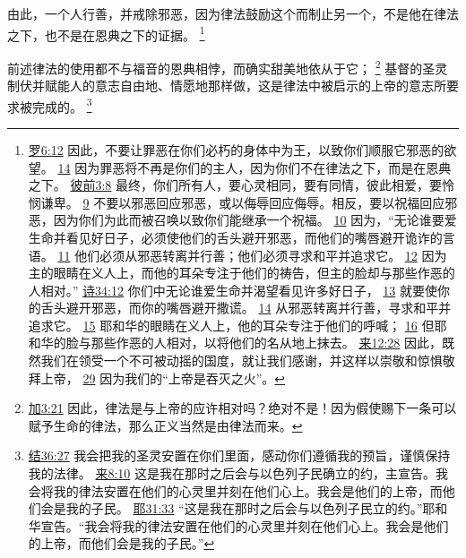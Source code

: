 \documentclass[12pt, a4paper, oneside]{ctexart}
\newcounter{parnum}[section]
\newcommand{\N}{%
   \noindent\refstepcounter{parnum}%
    \makebox[\parindent][l]{\textbf{\arabic{parnum}.}}}
\begin{document}
	由此，一个人行善，并戒除邪恶，因为律法鼓励这个而制止另一个，不是他在律法之下，也不是在恩典之下的证据。
	\footnote {
		\href{https://biblehub.com/romans/6-12.htm}{罗6:12} 因此，不要让罪恶在你们必朽的身体中为王，以致你们顺服它邪恶的欲望。
		\href{https://biblehub.com/romans/6-14.htm}{14} 因为罪恶将不再是你们的主人，因为你们不在律法之下，而是在恩典之下。
		\href{https://biblehub.com/1_peter/3-8.htm}{彼前3:8} 最终，你们所有人，要心灵相同，要有同情，彼此相爱，要怜悯谦卑。
		\href{https://biblehub.com/1_peter/3-9.htm}{9} 不要以邪恶回应邪恶，或以侮辱回应侮辱。相反，要以祝福回应邪恶，因为你们为此而被召唤以致你们能继承一个祝福。
		\href{https://biblehub.com/1_peter/3-10.htm}{10} 因为，“无论谁要爱生命并看见好日子，必须使他们的舌头避开邪恶，而他们的嘴唇避开诡诈的言语。
		\href{https://biblehub.com/1_peter/3-11.htm}{11} 他们必须从邪恶转离并行善；他们必须寻求和平并追求它。
		\href{https://biblehub.com/1_peter/3-12.htm}{12} 因为主的眼睛在义人上，而他的耳朵专注于他们的祷告，但主的脸却与那些作恶的人相对。”
		\href{https://biblehub.com/psalms/34-12.htm}{诗34:12} 你们中无论谁爱生命并渴望看见许多好日子，
		\href{https://biblehub.com/psalms/34-13.htm}{13} 就要使你的舌头避开邪恶，而你的嘴唇避开撒谎。
		\href{https://biblehub.com/psalms/34-14.htm}{14} 从邪恶转离并行善，寻求和平并追求它。
		\href{https://biblehub.com/psalms/34-15.htm}{15} 耶和华的眼睛在义人上，他的耳朵专注于他们的呼喊；
		\href{https://biblehub.com/psalms/34-16.htm}{16} 但耶和华的脸与那些作恶的人相对，以将他们的名从地上抹去。
		\href{https://biblehub.com/hebrews/12-28.htm}{来12:28} 因此，既然我们在领受一个不可被动摇的国度，就让我们感谢，并这样以崇敬和惊惧敬拜上帝，
		\href{https://biblehub.com/hebrews/12-29.htm}{29} 因为我们的“上帝是吞灭之火”。
	}

\N 前述律法的使用都不与福音的恩典相悖，而确实甜美地依从于它；
	\footnote {
		\href{https://biblehub.com/galatians/3-21.htm}{加3:21} 因此，律法是与上帝的应许相对吗？绝对不是！因为假使赐下一条可以赋予生命的律法，那么正义当然是由律法而来。
	}
	基督的圣灵制伏并赋能人的意志自由地、情愿地那样做，这是律法中被启示的上帝的意志所要求被完成的。
	\footnote {
		\href{https://biblehub.com/ezekiel/36-27.htm}{结36:27} 我会把我的圣灵安置在你们里面，感动你们遵循我的预旨，谨慎保持我的法律。
		\href{https://biblehub.com/hebrews/8-10.htm}{来8:10} 这是我在那时之后会与以色列子民确立的约，主宣告。我会将我的律法安置在他们的心灵里并刻在他们心上。我会是他们的上帝，而他们会是我的子民。
		\href{https://biblehub.com/jeremiah/31-33.htm}{耶31:33} “这是我在那时之后会与以色列子民立的约。”耶和华宣告。“我会将我的律法安置在他们的心灵里并刻在他们心上。我会是他们的上帝，而他们会是我的子民。”
	}
\end{document}
